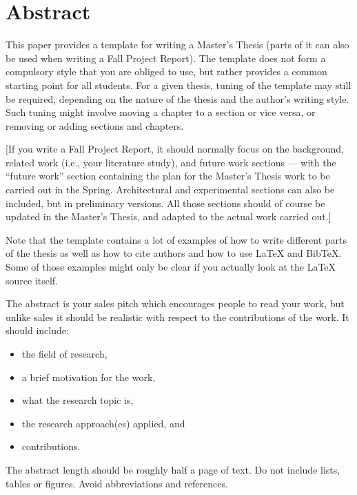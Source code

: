 \section*{Abstract}
This paper provides a template for writing a Master's Thesis 
(parts of it can also be used when writing a Fall Project Report). 
The template does not form a compulsory style that you are obliged to use, but rather provides a common starting point for all students. For a given thesis, tuning of the template may still be required, depending on the nature of the thesis and the author's writing style. 
Such tuning might involve moving a chapter to a section or vice versa, or removing or adding sections and chapters.

[If you write a Fall Project Report, it should normally focus on the background, related work (i.e., your literature study), and future work sections --- 
with the ``future work'' section containing the plan for the Master's Thesis work to be carried out in the Spring. 
Architectural and experimental sections can also be included, but in preliminary versions. 
All those sections should of course be updated in the Master's Thesis, and adapted to the actual work carried out.]

Note that the template contains a lot of examples of how to write different parts of the thesis 
as well as how to cite authors and how to use LaTeX and BibTeX. 
Some of those examples might only be clear if you actually look at the LaTeX source itself.

The abstract is your sales pitch which encourages people to read your work, 
but unlike sales it should be realistic with respect to the contributions of the work. 
It should include:
\begin{itemize}
\item the field of research,
\item a brief motivation for the work,
\item what the research topic is, 
\item the research approach(es) applied, and 
\item contributions.
\end{itemize}

The abstract length should be roughly half a page of text. 
Do not include lists, tables or figures.
Avoid abbreviations and references.  